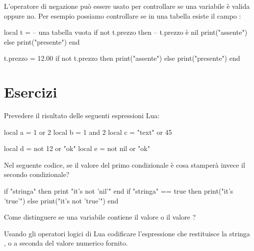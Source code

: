 L'operatore di negazione può essere usato per controllare se una variabile è
valida oppure no. Per esempio possiamo controllare se in una tabella esiste il
campo :
\begin{lines}
local t = {} -- una tabella vuota
if not t.prezzo then -- t.prezzo è nil
    print("assente")
else
    print("presente")
end

t.prezzo = 12.00
if not t.prezzo then
    print("assente")
else
    print("presente")
end
\end{lines}


\section{Esercizi}

\begin{Exercise}[label=oplogic-01]
Prevedere il risultato delle seguenti espressioni Lua:
\begin{lines}
local a = 1 or 2
local b = 1 and 2
local c = "text" or 45

local d = not 12 or "ok"
local e = not nil or "ok"
\end{lines}
\end{Exercise}

\begin{Exercise}[label=oplogic-02]
Nel seguente codice, se il valore del primo condizionale è  cosa
stamperà invece il secondo condizionale?
\begin{lines}
if "stringa" then print "it's not 'nil'" end
if "stringa" == true then
    print("it's 'true'")
else
    print("it's not 'true'")
end
\end{lines}
\end{Exercise}

\begin{Exercise}[label=oplogic-03]
Come distinguere se una variabile contiene il valore  o il valore
?  
\end{Exercise}

\begin{Exercise}[label=oplogic-04]
Usando gli operatori logici di Lua codificare l'espressione che restituisce
la stringa ,  o  a seconda del valore numerico fornito.
\end{Exercise}

